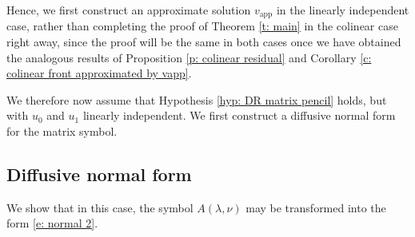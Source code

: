 \documentclass[11pt]{article}
\numberwithin{equation}{section}
\numberwithin{prop}{section}
\begin{document}
Hence, we first construct an approximate solution $v_\mathrm{app}$ in the linearly independent case, rather than completing the proof of Theorem \ref{t: main} in the colinear case right away, since the proof will be the same in both cases once we have obtained the analogous results of Proposition \ref{p: colinear residual} and Corollary \ref{c: colinear front approximated by vapp}. 

We therefore now assume that Hypothesis \ref{hyp: DR matrix pencil} holds, but with $u_0$ and $u_1$ linearly independent. We first construct a diffusive normal form for the matrix symbol. 

\subsection{Diffusive normal form}
We show that in this case, the symbol $A(\lambda, \nu)$ may be transformed into the form \eqref{e: normal 2}. 
\end{document}

